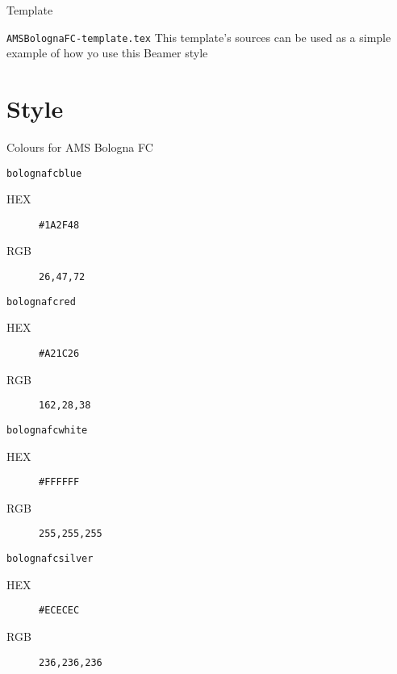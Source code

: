 \documentclass[presentation]{beamer}\mode<presentation>{\usetheme{AMSBolognaFC}}
\begin{document}
\begin{frame}[c,fragile]{Template}
%
\begin{block}{\texttt{AMSBolognaFC-template.tex}}
This template's sources can be used as a simple example of how yo use this Beamer style
\end{block}
%
\end{frame}


\section{Style}

\begin{frame}[c,allowframebreaks]{Colours for AMS Bologna FC}
%
\begin{exampleblock}{\texttt{\textcolor{bolognafcblue}{bolognafcblue}}}
	\begin{description}
		\item[HEX] \texttt{\#1A2F48}
		\item[RGB] \texttt{26,47,72}
	\end{description}
\end{exampleblock}
\begin{exampleblock}{\texttt{\textcolor{bolognafcred}{bolognafcred}}}
	\begin{description}
		\item[HEX] \texttt{\#A21C26}
		\item[RGB] \texttt{162,28,38}
	\end{description}
\end{exampleblock}
\framebreak
\begin{block}{\texttt{\textcolor{bolognafcwhite}{bolognafcwhite}}}
	\begin{description}
		\item[HEX] \texttt{\#FFFFFF}
		\item[RGB] \texttt{255,255,255}
	\end{description}
\end{block}
\begin{alertblock}{\texttt{\textcolor{bolognafcsilver}{bolognafcsilver}}}
	\begin{description}
		\item[HEX] \texttt{\#ECECEC}
		\item[RGB] \texttt{236,236,236}
	\end{description}
\end{alertblock}
%
\end{frame}
\end{document}
